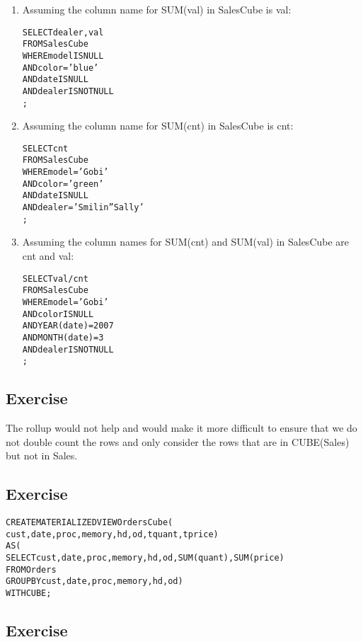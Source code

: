 \begin{enumerate}
\item
Assuming the column name for SUM(val) in SalesCube is val:
\begin{alltt}
SELECT   dealer, val
FROM     SalesCube
WHERE    model IS NULL
  AND    color = 'blue'
  AND    date IS NULL
  AND    dealer IS NOT NULL
;
\end{alltt}
\item
Assuming the column name for SUM(cnt) in SalesCube is cnt:
\begin{alltt}
SELECT   cnt
FROM     SalesCube
WHERE    model = 'Gobi'
  AND    color = 'green'
  AND    date IS NULL
  AND    dealer = 'Smilin'' Sally'
;
\end{alltt}
\item
Assuming the column names for SUM(cnt) and SUM(val) in SalesCube are
cnt and val:
\begin{alltt}
SELECT   val/cnt
FROM     SalesCube
WHERE    model = 'Gobi'
  AND    color IS NULL
  AND    YEAR(date) = 2007
  AND    MONTH(date) = 3
  AND    dealer IS NOT NULL
;
\end{alltt}
\end{enumerate}

\setcounter{subsection}{3}
\subsection*{Exercise \thesubsection}
The rollup would not help and would make it more difficult to ensure that
we do not double count the rows and only consider the rows that are
in CUBE(Sales) but not in Sales.


\setcounter{subsection}{4}
\subsection*{Exercise \thesubsection}
\begin{alltt}
CREATE MATERIALIZED VIEW OrdersCube(
  cust, date, proc, memory, hd, od, tquant, tprice)
 AS(
  SELECT cust, date, proc, memory, hd, od, SUM(quant), SUM(price)
  FROM   Orders
  GROUP BY cust, date, proc, memory, hd, od)
WITH CUBE;
\end{alltt}

\setcounter{subsection}{5}
\subsection*{Exercise \thesubsection}

